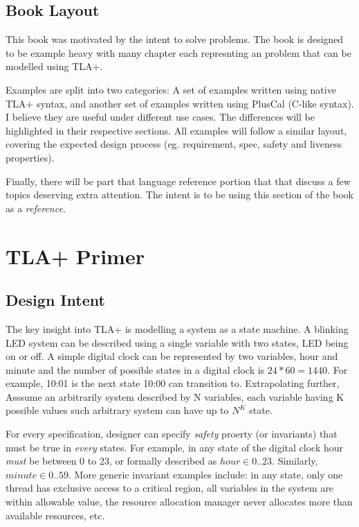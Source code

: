 \documentclass{report}
\begin{document}
\section{Book Layout}

This book was motivated by the intent to solve problems. The book is designed to
be example heavy with many chapter each represnting an problem that can be
modelled using TLA+.\newline

Examples are split into two categories: A set of examples written using native
TLA+ syntax, and another set of examples written using PlusCal (C-like syntax).
I believe they are useful under different use cases. The differences will be
highlighted in their respective sections. All examples will follow a similar 
layout, covering the expected design process (eg. requirement, spec, safety and
liveness properties). \newline

Finally, there will be part that language reference portion that that discuss a
few topics deserving extra attention. The intent is to be using this section of the 
book as a \textit{reference}.

\chapter{TLA+ Primer}

\section{Design Intent}

The key insight into TLA+ is modelling a system as a state machine. A blinking
LED system can be described using a single variable with two states, LED being
on or off. A simple digital clock can be represented by two variables, hour and
minute and the number of possible states in a digital clock is $24 * 60 = 1440$.
For example, 10:01 is the next state 10:00 can transition to.  Extrapolating
further, Asssume an arbitrarily system described by N variables, each variable
having K possible values such arbitrary system can have up to $N^K$
state.\newline

For every specification, designer can specify \textit{safety} proerty (or
invariants) that must be true in \textit{every} states. For example, in any
state of the digital clock hour \textit{must} be between 0 to 23, or formally
described as $hour \in 0..23$.  Similarly, $minute \in 0..59$. More generic
invariant examples include: in any state, only one thread has exclusive access
to a critical region, all variables in the system are within allowable value,
the resource allocation manager never allocates more than available resources,
etc. \newline
\end{document}

